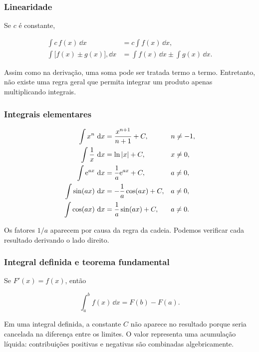 \subsubsection*{Linearidade}

Se $c$ é constante,

\begin{align}
  \int c\,f(x)\,\dd x
    &=c\int f(x)\,\dd x,\\
  \int\bigl[f(x)\pm g(x)\bigr],\dd x
    &=\int f(x)\,\dd x
      \pm\int g(x)\,\dd x.
\end{align}

Assim como na derivação, uma soma pode ser tratada termo a termo. Entretanto, não existe uma regra geral que permita integrar um produto apenas multiplicando integrais.

\subsubsection*{Integrais elementares}

\begin{align}
  \int x^n\,\mathop{}\!\mathrm{d} x
    &=\frac{x^{n+1}}{n+1}+C,
    &&n\neq-1,\\
  \int \frac{1}{x}\,\mathop{}\!\mathrm{d} x
    &=\ln|x|+C,
    &&x\neq0,\\
  \int \mathrm{e}^{ax}\,\mathop{}\!\mathrm{d} x
    &=\frac{1}{a}\mathrm{e}^{ax}+C,
    &&a\neq0,\\
  \int \sin(ax)\,\mathop{}\!\mathrm{d} x
    &=-\frac{1}{a}\cos(ax)+C,
    &&a\neq0,\\
  \int \cos(ax)\,\mathop{}\!\mathrm{d} x
    &=\frac{1}{a}\sin(ax)+C,
    &&a\neq0.
\end{align}

Os fatores $1/a$ aparecem por causa da regra da cadeia. Podemos verificar cada resultado derivando o lado direito.

\subsubsection*{Integral definida e teorema fundamental}

Se $F'(x)=f(x)$, então

\begin{equation}
  \int_a^b f(x)\,\dd x=F(b)-F(a).
\end{equation}

Em uma integral definida, a constante $C$ não aparece no resultado porque seria cancelada na diferença entre os limites. O valor representa uma acumulação líquida: contribuições positivas e negativas são combinadas algebricamente.

